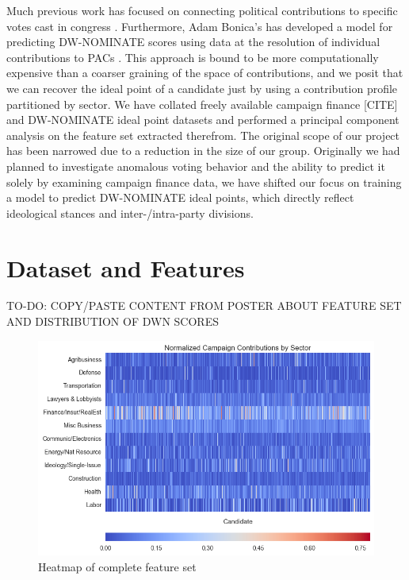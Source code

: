 \documentclass[12]{article}
\begin{document}
\noindent Much previous work has focused on connecting political contributions to specific votes cast in congress \cite{stratmann1991campaign,stratmann1995campaign}. Furthermore, Adam Bonica's has developed a model for predicting DW-NOMINATE scores using data at the resolution of individual contributions to PACs \cite{bonica2013ideology}. This approach is bound to be more computationally expensive than a coarser graining of the space of contributions, and we posit that we can recover the ideal point of a candidate just by using a contribution profile partitioned by sector. We have collated freely available campaign finance [CITE] and DW-NOMINATE ideal point \cite{DWWEB} datasets and performed a principal component analysis on the feature set extracted therefrom. The original scope of our project has been narrowed due to a reduction in the size of our group. Originally we had planned to investigate anomalous voting behavior and the ability to predict it solely by examining campaign finance data, we have shifted our focus on training a model to predict DW-NOMINATE ideal points, which directly reflect ideological stances and inter-/intra-party divisions.\\

\section*{Dataset and Features}

TO-DO: COPY/PASTE CONTENT FROM POSTER ABOUT FEATURE SET AND DISTRIBUTION OF DWN SCORES  

\begin{figure}[H]
\centering
\includegraphics[width=.8\textwidth]{cand_2010_2012_2014_fm_trim_normed_feature_hm.png}
\caption{\label{fig:pc_all}Heatmap of complete feature set}
\end{figure}
\end{document}
